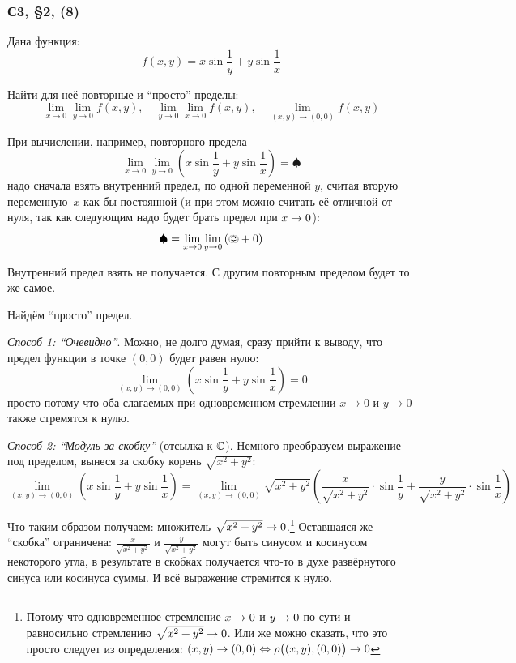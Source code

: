 \documentclass[a4paper,12pt]{article}
\begin{document}
  \subsubsection{С3, \S 2, (8)}

  Дана функция:
  \[
    f(x, y) = x \sin \frac{1}{y} + y \sin \frac{1}{x}
  \]
  
  Найти для неё повторные и ``просто'' пределы:
  \[
    \lim_{x \to 0} \lim_{y \to 0} f(x, y),\quad \lim_{y \to 0} \lim_{x \to 0} f(x, y),\quad \lim_{(x, y) \to (0, 0)} f(x, y)
  \]
  
  \begin{solution}
    При вычислении, например, повторного предела
    \[
      \lim_{x \to 0} \lim_{y \to 0} \left(x \sin \frac{1}{y} + y \sin \frac{1}{x}\right) = \spadesuit
    \]
    надо сначала взять внутренний предел, по одной переменной $y$, считая вторую переменную~$x$ как бы постоянной (и при этом можно считать её отличной от нуля, так как следующим надо будет брать предел при $x \hm\to 0$):  %
    \[
      \spadesuit = \lim_{x \to 0} \lim_{y \to 0} \left(\pumpkin + 0\right)
    \]

    Внутренний предел взять не получается.
    С другим повторным пределом будет то же самое.

    Найдём ``просто'' предел.

    \medskip

    \emph{Способ 1: ``Очевидно''}.
    Можно, не долго думая, сразу прийти к выводу, что предел функции в точке $(0, 0)$ будет равен нулю:
    \[
      \lim_{(x, y) \to (0, 0)} \left(x \sin \frac{1}{y} + y \sin \frac{1}{x}\right) = 0
    \]
    просто потому что оба слагаемых при одновременном стремлении $x \to 0$ и $y \to 0$ также стремятся к нулю.

    \medskip

    \emph{Способ 2: ``Модуль за скобку''} (отсылка к $\operatorname{\mathbb C}$).
    Немного преобразуем выражение под пределом, вынеся за скобку корень $\sqrt{x^2 + y^2}$:
    \[
      \lim_{(x, y) \to (0, 0)} \left(x \sin \frac{1}{y} + y \sin \frac{1}{x}\right) = \lim_{(x, y) \to (0, 0)} \sqrt{x^2 + y^2}\left(\frac{x}{\sqrt{x^2 + y^2}} \cdot \sin \frac{1}{y} + \frac{y}{\sqrt{x^2 + y^2}} \cdot \sin \frac{1}{x}\right)
    \]

    Что таким образом получаем: множитель $\sqrt{x^2 + y^2} \hm\to 0$.\footnote{
      Потому что одновременное стремление $x \hm\to 0$ и $y \hm\to 0$ по сути и равносильно стремлению $\sqrt{x^2 + y^2} \hm\to 0$.
      Или же можно сказать, что это просто следует из определения: $(x, y) \hm\to (0, 0) \hm\Leftrightarrow \rho\bigl((x, y), (0, 0)\bigr) \hm\to 0$
    }
    Оставшаяся же ``скобка'' ограничена: $\frac{x}{\sqrt{x^2 + y^2}}$ и $\frac{y}{\sqrt{x^2 + y^2}}$ могут быть синусом и косинусом некоторого угла, в результате в скобках получается что-то в духе развёрнутого синуса или косинуса суммы.
    И всё выражение стремится к нулю.


\end{solution}
\end{document}
